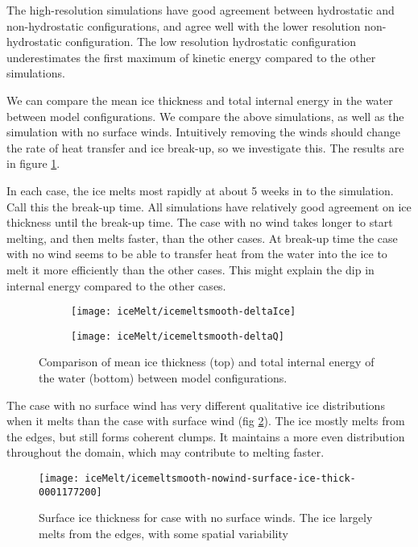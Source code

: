 \documentclass[11pt]{article}
\begin{document}
The high-resolution simulations have good agreement between hydrostatic and non-hydrostatic configurations, and agree well with the lower resolution non-hydrostatic configuration. The low resolution hydrostatic configuration underestimates the first maximum of kinetic energy compared to the other simulations.

We can compare the mean ice thickness and total internal energy in the water between model configurations. We compare the above simulations, as well as the simulation with no surface winds. Intuitively removing the winds should change the rate of heat transfer and ice break-up, so we investigate this. The results are in figure \ref{fig:iceMeltCompareWinds}.

In each case, the ice melts most rapidly at about 5 weeks in to the simulation. Call this the break-up time. All simulations have relatively good agreement on ice thickness until the break-up time. The case with no wind takes longer to start melting, and then melts faster, than the other cases. At break-up time the case with no wind seems to be able to transfer heat from the water into the ice to melt it more efficiently than the other cases. This might explain the dip in internal energy compared to the other cases.

\clearpage
\begin{figure}[h!]
\begin{subfigure}{0.95\linewidth}
\centering
\texttt{[image: iceMelt/icemeltsmooth-deltaIce]}
\end{subfigure}
\begin{subfigure}{0.95\linewidth}
\texttt{[image: iceMelt/icemeltsmooth-deltaQ]}
\end{subfigure}
\caption{Comparison of mean ice thickness (top) and total internal energy of the water (bottom) between model configurations.}
\label{fig:iceMeltCompareWinds}
\end{figure}

The case with no surface wind has very different qualitative ice distributions when it melts than the case with surface wind (fig \ref{fig:iceMeltNoWind}). The ice mostly melts from the edges, but still forms coherent clumps. It maintains a more even distribution throughout the domain, which may contribute to melting faster.

\begin{figure}[h!]
\centering
\texttt{[image: iceMelt/icemeltsmooth-nowind-surface-ice-thick-0001177200]}
\caption{Surface ice thickness for case with no surface winds. The ice largely melts from the edges, with some spatial variability}
\label{fig:iceMeltNoWind}
\end{figure}
\end{document}
